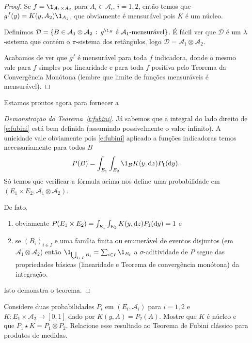\begin{proof}
  Se $f = \1_{A_1 \times A_2}$ para $A_i \in \mathcal{A}_i$, $i = 1,2$, então temos que $g^f(y) = K(y, A_2) \1_{A_1}$, que obviamente é mensurável pois $K$ é um núcleo.

  Definimos $\mathcal{D} = \{B \in \mathcal{A}_1 \otimes \mathcal{A}_2\, : \, g^{\1_B} \text{ é $\mathcal{A}_1$-mensurável}\}$.
  É fácil ver que $\mathcal{D}$ é um $\lambda$-sistema que contém o $\pi$-sistema dos retângulos, logo $\mathcal{D} = \mathcal{A}_1 \otimes \mathcal{A}_2$.

  Acabamos de ver que $g^f$ é mensurável para toda $f$ indicadora, donde o mesmo vale para $f$ simples por linearidade e para toda $f$ positiva pelo Teorema da Convergência Monótona (lembre que limite de funções mensuráveis é mensurável).
\end{proof}

Estamos prontos agora para fornecer a
\begin{proof}[Demonstração do Teorema~\ref{t:fubini}]
  Já sabemos que a integral do lado direito de \eqref{e:fubini} está bem definida (assumindo possivelmente o valor infinito).
  A unicidade vale obviamente pois \eqref{e:fubini} aplicado a funções indicadoras temos necessariamente para todos $B$
\begin{equation}
    P(B) = \int_{E_1} \int_{E_2} \1_{B} K(y, \d z) P_1 (\d y).
  \end{equation}
  Só temos que verificar a fórmula acima nos define uma probabilidade em $(E_1 \times E_2, \mathcal{A}_1 \otimes \mathcal{A}_2)$.

  De fato,
  \begin{enumerate}[\quad a)]
  \item obviamente $P(E_1 \times E_2) = \int_{E_1} \int_{E_2}  K(y, \mathop{}\!\mathrm{d} z) P_1(\mathop{}\!\mathrm{d} y) = 1$ e
  \item se $(B_i)_{i\in I}$ e uma família finita ou enumerável de eventos disjuntos (em $\mathcal{A}_1 \otimes \mathcal{A}_2$) então
  $\1_{\bigcup_{i\in I} B_i}=\sum_{i\in I} \1_{B_i}$ a $\sigma$-aditividade de $P$ segue das propriedades básicas
  (linearidade e Teorema de convergência monótona) da integração.
  \end{enumerate}
  Isto demonstra o teorema.
\end{proof}

\begin{exercise}
  \label{x:nucleo_constante}
  Considere duas probabilidades $P_i$ em $(E_i, \mathcal{A}_i)$ para $i = 1,2$ e $K:E_1 \times \mathcal{A}_2 \to [0,1]$ dado por $K(y,A) = P_2(A)$.
  Mostre que $K$ é núcleo e que $P_1 \star K = P_1 \otimes P_2$.
  Relacione esse resultado ao Teorema de Fubini clássico para produtos de medidas.
\end{exercise}

